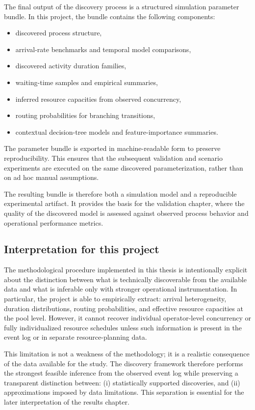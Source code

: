 The final output of the discovery process is a structured simulation parameter bundle.
In this project, the bundle contains the following components:
\begin{itemize}
    \item discovered process structure,
    \item arrival-rate benchmarks and temporal model comparisons,
    \item discovered activity duration families,
    \item waiting-time samples and empirical summaries,
    \item inferred resource capacities from observed concurrency,
    \item routing probabilities for branching transitions,
    \item contextual decision-tree models and feature-importance summaries.
\end{itemize}

The parameter bundle is exported in machine-readable form to preserve reproducibility.
This ensures that the subsequent validation and scenario experiments are executed on the same discovered parameterization, rather than on ad hoc manual assumptions.

The resulting bundle is therefore both a simulation model and a reproducible experimental artifact.
It provides the basis for the validation chapter, where the quality of the discovered model is assessed against observed process behavior and operational performance metrics.

\subsection{Interpretation for this project}

The methodological procedure implemented in this thesis is intentionally explicit about the distinction between what is technically discoverable from the available data and what is inferable only with stronger operational instrumentation.
In particular, the project is able to empirically extract:
arrival heterogeneity, duration distributions, routing probabilities, and effective resource capacities at the pool level.
However, it cannot recover individual operator-level concurrency or fully individualized resource schedules unless such information is present in the event log or in separate resource-planning data.

This limitation is not a weakness of the methodology;
it is a realistic consequence of the data available for the study.
The discovery framework therefore performs the strongest feasible inference from the observed event log while preserving a transparent distinction between:
(i) statistically supported discoveries, and
(ii) approximations imposed by data limitations.
This separation is essential for the later interpretation of the results chapter.


